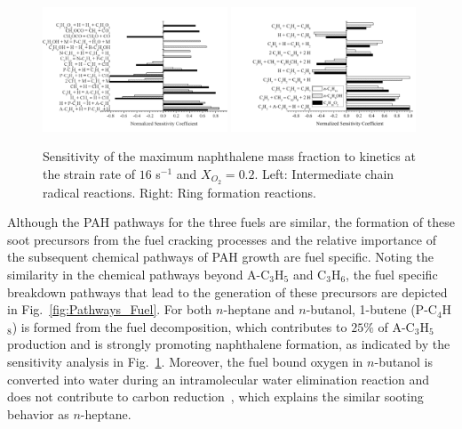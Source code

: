 \documentclass[review,3p,times]{elsarticleUS}
\begin{document}
\begin{figure}[ht]
  \centering
  \scriptsize
  \includegraphics[trim=0mm 0mm 0mm 8mm, clip=true,width=0.49\textwidth]{Chain.png}
  \includegraphics[trim=0mm 0mm 0mm 8mm, clip=true,width=0.49\textwidth]{Ring.png}
  \normalsize
  \vspace{-0.2in}
  \caption{Sensitivity of the maximum naphthalene mass fraction to kinetics at the strain rate of $16$ s$^{-1}$ and $X_{O_2}=0.2$. Left: Intermediate chain radical reactions. Right: Ring formation reactions.}
  \label{fig:SA4}
\end{figure}

Although the PAH pathways for the three fuels are similar, the formation of these soot precursors from the fuel cracking processes and the relative importance of the subsequent chemical pathways of PAH growth are fuel specific. Noting the similarity in the chemical pathways beyond A-C$_3$H$_5$ and C$_3$H$_6$, the fuel specific breakdown pathways that lead to the generation of these precursors are depicted in Fig.~\ref{fig:Pathways_Fuel}. For both $n$-heptane and $n$-butanol, 1-butene (P-C$_4$H$_8$) is formed from the fuel decomposition, which contributes to $25\%$ of A-C$_3$H$_5$ production and is strongly promoting naphthalene formation, as indicated by the sensitivity analysis in Fig.~\ref{fig:SA4}. Moreover, the fuel bound oxygen in $n$-butanol is converted into water during an intramolecular water elimination reaction and does not contribute to carbon reduction~\cite{mcenally05,mcenally11}, which explains the similar sooting behavior as $n$-heptane.
\end{document}
